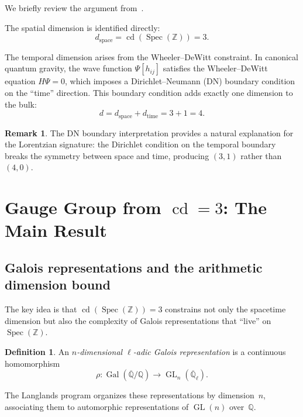 \documentclass[12pt,a4paper]{article}
\theoremstyle{definition}
\newtheorem{definition}[theorem]{Definition}
\newtheorem{remark}[theorem]{Remark}
\newcommand{\Spec}{\operatorname{Spec}}
\newcommand{\GL}{\operatorname{GL}}
\newcommand{\cd}{\operatorname{cd}}
\newcommand{\Gal}{\operatorname{Gal}}
\newcommand{\Q}{\mathbb{Q}}
\newcommand{\Z}{\mathbb{Z}}
\begin{document}
We briefly review the argument from~\cite{WB_spacetime}.

The spatial dimension is identified directly:
\begin{equation}
  d_{\text{space}} = \cd(\Spec(\Z)) = 3.
\end{equation}

The temporal dimension arises from the Wheeler--DeWitt constraint.
In canonical quantum gravity, the wave function
$\Psi[h_{ij}]$ satisfies the Wheeler--DeWitt equation
$\hat{H}\Psi = 0$, which imposes a Dirichlet--Neumann (DN)
boundary condition on the ``time'' direction.
This boundary condition adds exactly one dimension to the bulk:
\begin{equation}
  d = d_{\text{space}} + d_{\text{time}} = 3 + 1 = 4.
\end{equation}

\begin{remark}
The DN boundary interpretation provides a natural explanation
for the Lorentzian signature: the Dirichlet condition on the
temporal boundary breaks the symmetry between space and time,
producing $(3,1)$ rather than $(4,0)$.
\end{remark}

\section{Gauge Group from $\cd = 3$: The Main Result}\label{sec:gauge}

\subsection{Galois representations and the arithmetic dimension bound}

The key idea is that $\cd(\Spec(\Z))=3$ constrains
not only the spacetime dimension but also the complexity
of Galois representations that ``live'' on $\Spec(\Z)$.

\begin{definition}
An \emph{$n$-dimensional $\ell$-adic Galois representation}
is a continuous homomorphism
\[
  \rho\colon \Gal(\overline{\Q}/\Q) \to \GL_n(\overline{\Q}_\ell).
\]
\end{definition}

The Langlands program organizes these representations by dimension~$n$,
associating them to automorphic representations of $\GL(n)$ over~$\Q$.
\end{document}

